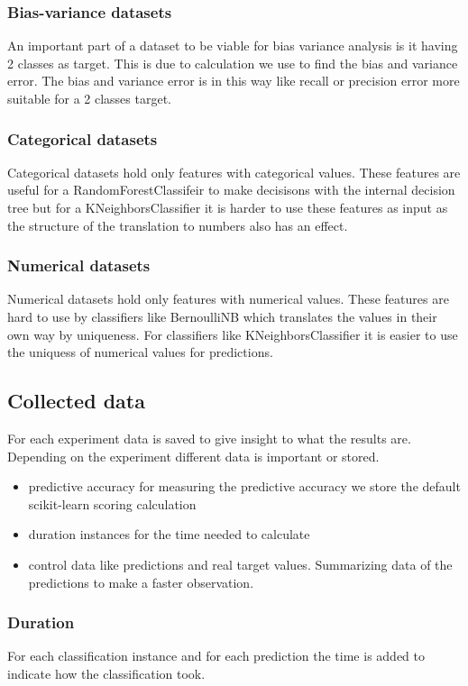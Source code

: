\documentclass[a4paper,10pt]{article}
\begin{document}
\subsubsection{Bias-variance datasets}
An important part of a dataset to be viable for bias variance analysis is it having 2 classes as target. This is due to calculation we use to find the bias and variance error. The bias and variance error is in this way like recall or precision error more suitable for a 2 classes target.  %
\subsubsection{Categorical datasets}
Categorical datasets hold only features with categorical values. These features are useful for a RandomForestClassifeir to make decisisons with the internal decision tree but for a KNeighborsClassifier it is harder to use these features as input as the structure of the translation to numbers also has an effect.
\subsubsection{Numerical datasets}
Numerical datasets hold only features with numerical values. These features are hard to use by classifiers like BernoulliNB which translates the values in their own way by uniqueness. For classifiers like KNeighborsClassifier it is easier to use the uniquess of numerical values for predictions.

\subsection{Collected data}
For each experiment data is saved to give insight to what the results are. Depending on the experiment different data is important or stored. 
\begin{itemize}
	\item predictive accuracy for measuring the predictive accuracy we store the default scikit-learn scoring calculation
	\item duration instances for the time needed to calculate 
	\item control data like predictions and real target values. Summarizing data of the predictions to make a faster observation. 
\end{itemize}
\subsubsection{Duration}
For each classification instance and for each prediction the time is added to indicate how the classification took. 
\end{document}
